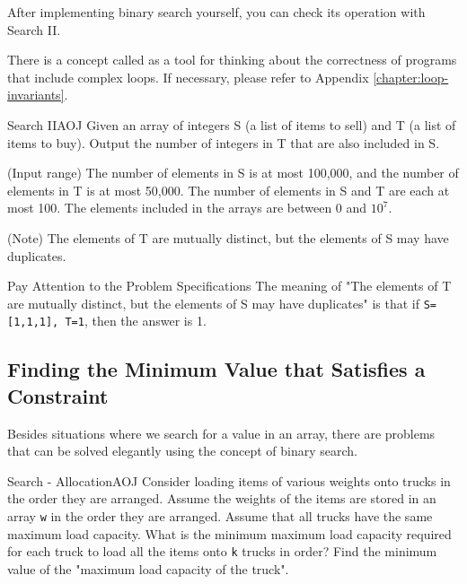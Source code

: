 After implementing binary search yourself, you can check its operation with Search II.

There is a concept called  as a tool for thinking about the correctness of programs that include complex loops. If necessary, please refer to Appendix \ref{chapter:loop-invariants}.

\begin{psbox}{Search II}{AOJ}
Given an array of integers S (a list of items to sell) and T (a list of items to buy).
Output the number of integers in T that are also included in S.

(Input range) The number of elements in S is at most 100,000, and the number of elements in T is at most 50,000.
The number of elements in S and T are each at most 100. The elements included in the arrays are between 0 and $10^7$.

(Note) The elements of T are mutually distinct, but the elements of S may have duplicates.

\end{psbox}

\begin{debugbox}{Pay Attention to the Problem Specifications}
The meaning of "The elements of T are mutually distinct, but the elements of S may have duplicates" is that if \texttt{S=[1,1,1], T={1}}, then the answer is 1.
\end{debugbox}
\subsection{Finding the Minimum Value that Satisfies a Constraint}

Besides situations where we search for a value in an array, there are problems that can be solved elegantly using the concept of binary search.

\begin{psbox}{Search - Allocation}{AOJ}
Consider loading items of various weights onto trucks in the order they are arranged. Assume the weights of the items are stored in an array \texttt{w} in the order they are arranged.
Assume that all trucks have the same maximum load capacity. What is the minimum maximum load capacity required for each truck to load all the items onto \texttt{k} trucks in order?
Find the minimum value of the "maximum load capacity of the truck".

\end{psbox}

